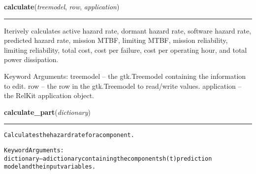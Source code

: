     \label{reliafree:calculations:calculate}

    \vspace{0.5ex}

\hspace{.8\funcindent}\begin{boxedminipage}{\funcwidth}

    \raggedright \textbf{calculate}(\textit{treemodel}, \textit{row}, \textit{application})

    \vspace{-1.5ex}

    \rule{\textwidth}{0.5\fboxrule}
\setlength{\parskip}{2ex}
    Iterively calculates active hazard rate, dormant hazard rate, software 
    hazard rate, predicted hazard rate, mission MTBF, limiting MTBF, 
    mission reliability, limiting reliability, total cost, cost per 
    failure, cost per operating hour, and total power dissipation.

    Keyword Arguments: treemodel   -- the gtk.Treemodel containing the 
    information to edit. row         -- the row in the gtk.Treemodel to 
    read/write values. application -- the RelKit application object.

\setlength{\parskip}{1ex}
    \end{boxedminipage}

    \label{reliafree:calculations:calculate_part}

    \vspace{0.5ex}

\hspace{.8\funcindent}\begin{boxedminipage}{\funcwidth}

    \raggedright \textbf{calculate\_part}(\textit{dictionary})

    \vspace{-1.5ex}

    \rule{\textwidth}{0.5\fboxrule}
\setlength{\parskip}{2ex}
\begin{alltt}
Calculates the hazard rate for a component.

Keyword Arguments:
dictionary -- a dictionary containing the components h(t) prediction
              model and the input variables.
\end{alltt}

\setlength{\parskip}{1ex}
    \end{boxedminipage}

